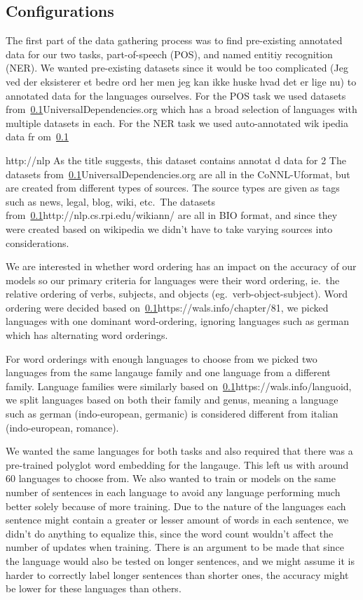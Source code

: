 
\subsection{Configurations}

The first part of the data gathering process was to find pre-existing annotated
data for our two tasks, part-of-speech (POS), and named entitiy recognition
(NER). We wanted pre-existing datasets since it would be {too complicated (Jeg
ved der eksisterer et bedre ord her men jeg kan ikke huske hvad det er lige nu)}
to annotated data for the languages ourselves. For the POS task we used datasets
from~\ref{}{UniversalDependencies.org} which has a broad selection of languages
with multiple datasets in each. For the NER task we used auto-annotated wik
ipedia data fr om~\ref{}{http://nlp As the title suggests, this dataset contains
annotat d data for 2 The datasets from~\ref{}{UniversalDependencies.org} are all
in the CoNNL-Uformat, but are created from different types of sources. The
source types are given as tags such as news, legal, blog, wiki, etc.\ The
datasets from~\ref{}{http://nlp.cs.rpi.edu/wikiann/} are all in BIO format, and
since they were created based on wikipedia we didn't have to take varying
sources into considerations.

We are interested in whether word ordering has an impact on the accuracy of our
models so our primary criteria for languages were their word ordering, ie.\ the
relative ordering of verbs, subjects, and objects (eg.\ verb-object-subject).
Word ordering were decided based on~\ref{}{https://wals.info/chapter/81}, we
picked languages with one dominant word-ordering, ignoring languages such as
german which has alternating word orderings. 

For word orderings with enough languages to choose from we picked two languages
from the same langauge family and one language from a different family. Language
families were similarly based on~\ref{}{https://wals.info/languoid}, we split
languages based on both their family and genus, meaning a language such as
german (indo-european, germanic) is considered different from italian
(indo-european, romance).

We wanted the same languages for both tasks and also required that there was a
pre-trained polyglot word embedding for the langauge. This left us with around
60 languages to choose from. We also wanted to train or models on the same
number of sentences in each language to avoid any language performing much
better solely because of more training. Due to the nature of the languages each
sentence might contain a greater or lesser amount of words in each sentence, we
didn't do anything to equalize this, since the word count wouldn't affect the
number of updates when training. There is an argument to be made that since the
language would also be tested on longer sentences, and we might assume it is
harder to correctly label longer sentences than shorter ones, the accuracy might
be lower for these languages than others. 

}
